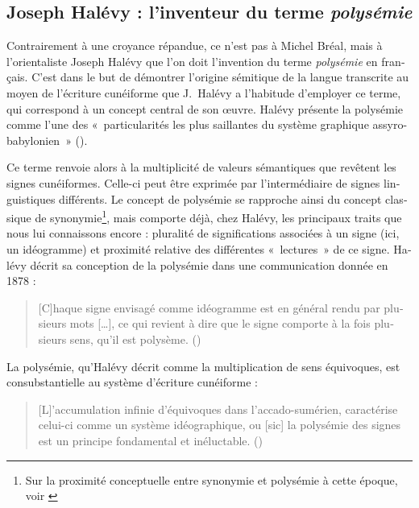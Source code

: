 \documentclass[output=paper]{langsci/langscibook}
\begin{document}
\begin{otherlanguage}{french}
\subsection{Joseph Halévy : l’inventeur du terme \textit{polysémie}}

Contrairement à une croyance répandue, ce n’est pas à Michel Bréal, mais à l’orientaliste Joseph Halévy que l’on doit l’invention du terme \textit{polysémie} en français. C’est dans le but de démontrer l’origine sémitique de la langue transcrite au moyen de l’écriture cunéiforme que J.~Halévy a l’habitude d’employer ce terme, qui correspond à un concept central de son œuvre. Halévy présente la polysémie comme l’une des «~particularités les plus saillantes du système graphique assyro-babylonien~» (\citealt[298]{halevy_recherches_1876}).

Ce terme renvoie alors à la multiplicité de valeurs sémantiques que revêtent les signes cunéiformes. Celle-ci peut être exprimée par l’intermédiaire de signes linguistiques différents. Le concept de polysémie se rapproche ainsi du concept classique de synonymie\footnote{Sur la proximité conceptuelle entre synonymie et polysémie à cette époque, voir \citealt{delesalle_statut_1986}}, mais comporte déjà, chez Halévy, les principaux traits que nous lui connaissons encore : pluralité de significations associées à un signe (ici, un idéogramme) et proximité relative des différentes «~lectures~» de ce signe. Halévy décrit sa conception de la polysémie dans une communication donnée en 1878 :

\begin{quote}
[C]haque signe envisagé comme idéogramme est en général rendu par plusieurs mots […], ce qui revient à dire que le signe comporte à la fois plusieurs sens, qu’il est polysème. (\citealt[275]{halevy_melanges_1883})
\end{quote}

La polysémie, qu’Halévy décrit comme la multiplication de sens équivoques, est consubstantielle au système d’écriture cunéiforme :

\begin{quote}
    [L]’accumulation infinie d’équivoques dans l’accado-sumérien, caractérise celui-ci comme un système idéographique, ou [sic] la polysémie des signes est un principe fondamental et inéluctable. (\citealt[276]{halevy_melanges_1883})
\end{quote}


\end{otherlanguage}
\end{document}
